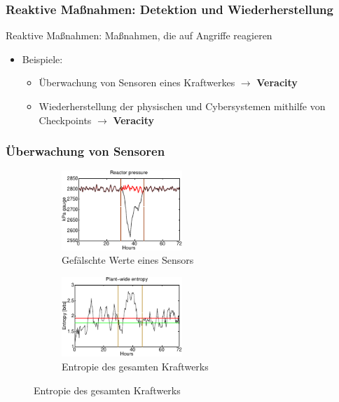 \documentclass{sikslides}
\begin{document}
    \begin{frame}
        \frametitle{Reaktive Maßnahmen: Detektion und Wiederherstellung}
        \begin{block}{}
            Reaktive Maßnahmen: Maßnahmen, die auf Angriffe reagieren
        \end{block}
        \begin{itemize}
            \item Beispiele:
            \begin{itemize}
                \item Überwachung von Sensoren eines Kraftwerkes $\rightarrow$ \textbf{Veracity}
                \item Wiederherstellung der physischen und Cybersystemen mithilfe von Checkpoints $\rightarrow$ \textbf{Veracity}
            \end{itemize}
        \end{itemize}
    \end{frame}

    \begin{frame}
        \frametitle{Überwachung von Sensoren}
        \begin{figure}
            \centering
            \begin{subfigure}{0.49\textwidth}
                \includegraphics[height=3cm]{../figure/entropy_a}
                \caption{Gefälschte Werte eines Sensors}
            \end{subfigure}
            \begin{subfigure}{0.49\textwidth}
                \includegraphics[height=3cm]{../figure/entropy_b}
                \caption{Entropie des gesamten Kraftwerks}
            \end{subfigure}
        \end{figure}
    \end{frame}
\end{document}
